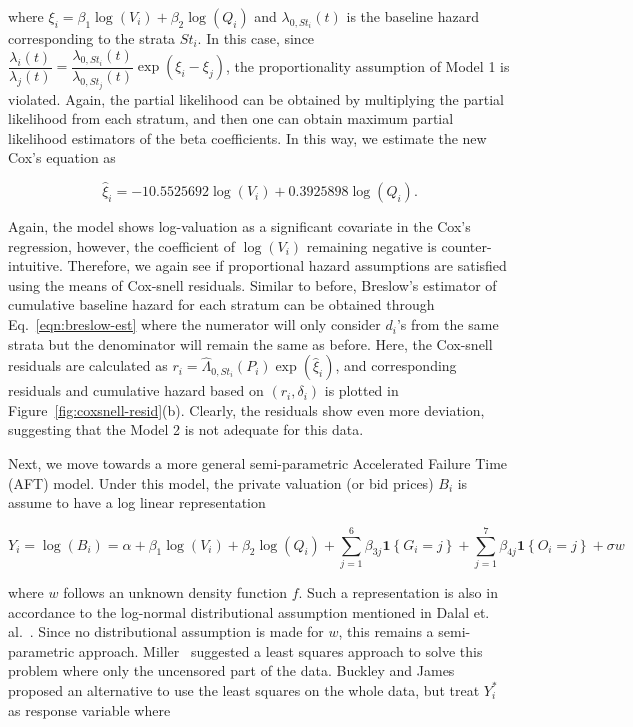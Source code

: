 \documentclass[a4paper,12pt]{article}
\newcommand{\ind}[1]{\boldsymbol{1}\left\{ #1 \right\}}
\begin{document}
\noindent where $\xi_i = \beta_1 \log(V_i) + \beta_2 \log(Q_i)$ and $\lambda_{0, St_i}(t)$ is the baseline hazard corresponding to the strata $St_i$. In this case, since $\dfrac{\lambda_i(t)}{\lambda_j(t)} = \dfrac{\lambda_{0, St_i}(t)}{\lambda_{0, St_j}(t)} \exp(\xi_i - \xi_j)$, the proportionality assumption of Model 1 is violated. Again, the partial likelihood can be obtained by multiplying the partial likelihood from each stratum, and then one can obtain maximum partial likelihood estimators of the beta coefficients. In this way, we estimate the new Cox's equation as 

\begin{equation}
    \widehat{\xi}_i = -10.5525692 \log(V_i) + 0.3925898 \log(Q_i).
    \label{eqn:model2-fit}
\end{equation}

\noindent Again, the model shows log-valuation as a significant covariate in the Cox's regression, however, the coefficient of $\log(V_i)$ remaining negative is counter-intuitive. Therefore, we again see if proportional hazard assumptions are satisfied using the means of Cox-snell residuals. Similar to before, Breslow's estimator of cumulative baseline hazard for each stratum can be obtained through Eq.~\eqref{eqn:breslow-est} where the numerator will only consider $d_i$'s from the same strata but the denominator will remain the same as before. Here, the Cox-snell residuals are calculated as $r_i = \widehat{\Lambda}_{0, St_i}(P_i)\exp(\widehat{\xi}_i)$, and corresponding residuals and cumulative hazard based on $(r_i, \delta_i)$ is plotted in Figure~\ref{fig:coxsnell-resid}(b). Clearly, the residuals show even more deviation, suggesting that the Model 2 is not adequate for this data.

Next, we move towards a more general semi-parametric Accelerated Failure Time (AFT) model. Under this model, the private valuation (or bid prices) $B_i$ is assume to have a log linear representation

$$
Y_i = \log(B_i) = \alpha + \beta_1 \log(V_i) + \beta_2 \log(Q_i) + \sum_{j=1}^6 \beta_{3j} \ind{G_i = j} + \sum_{j=1}^7 \beta_{4j} \ind{O_i = j} + \sigma w
$$

\noindent where $w$ follows an unknown density function $f$. Such a representation is also in accordance to the log-normal distributional assumption mentioned in Dalal et. al.~\cite{dalal2020information}. Since no distributional assumption is made for $w$, this remains a semi-parametric approach. Miller~\cite{miller1976least} suggested a least squares approach to solve this problem where only the uncensored part of the data. Buckley and James~\cite{buckley1979linear} proposed an alternative to use the least squares on the whole data, but treat $Y_i^\ast$ as response variable where 
\end{document}
